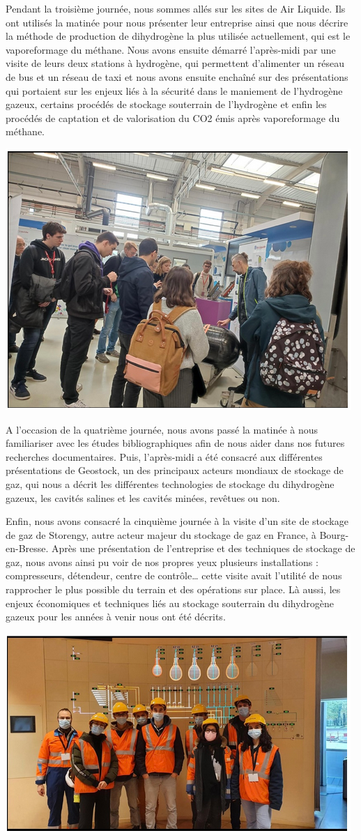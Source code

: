 \documentclass[11pt,french,a4paper]{article}
\begin{document}
Pendant la troisième journée, nous sommes allés sur les sites de Air Liquide. Ils ont utilisés la matinée pour nous présenter leur entreprise ainsi que nous décrire la méthode de production de dihydrogène la plus utilisée actuellement, qui est le vaporeformage du méthane. Nous avons ensuite démarré l’après-midi par une visite de leurs deux stations à hydrogène, qui permettent d’alimenter un réseau de bus et un réseau de taxi et nous avons ensuite enchaîné sur des présentations qui portaient sur les enjeux liés à la sécurité dans le maniement de l’hydrogène gazeux, certains procédés de stockage souterrain de l’hydrogène et enfin les procédés de captation et de valorisation du CO2 émis après vaporeformage du méthane. 
\begin{center}
\includegraphics[width=0.5\linewidth]{image/annexe/tab_bord1.png}
\end{center}


A l’occasion de la quatrième journée, nous avons passé la matinée à nous familiariser avec les études bibliographiques afin de nous aider dans nos futures recherches documentaires. Puis, l’après-midi a été consacré aux différentes présentations de Geostock, un des principaux acteurs mondiaux de stockage de gaz, qui nous a décrit les différentes technologies de stockage du dihydrogène gazeux, les cavités salines et les cavités minées, revêtues ou non.

Enfin, nous avons consacré la cinquième journée à la visite d’un site de stockage de gaz de Storengy, autre acteur majeur du stockage de gaz en France, à Bourg-en-Bresse. Après une présentation de l’entreprise et des techniques de stockage de gaz, nous avons ainsi pu voir de nos propres yeux plusieurs installations : compresseurs, détendeur, centre de contrôle… cette visite avait l’utilité de nous rapprocher le plus possible du terrain et des opérations sur place. Là aussi, les enjeux économiques et techniques liés au stockage souterrain du dihydrogène gazeux pour les années à venir nous ont été décrits.
\begin{center}
\includegraphics[width=0.5\linewidth]{image/annexe/tab_bord2.png}
\end{center}
\end{document}
